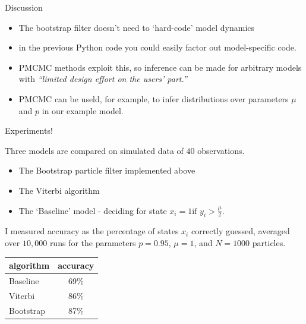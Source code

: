 \documentclass[pdf]
{beamer}
\begin{document}
\begin{frame}{Discussion}
	\begin{itemize}
		\item The bootstrap filter doesn't need to `hard-code' model dynamics
		\item in the previous Python code you could easily factor out model-specific code.
		\item PMCMC methods exploit this, so inference can be made for arbitrary models with
			  \textit{``limited design effort on the users' part.''}
		\item PMCMC can be useld, for example, to infer distributions over parameters $\mu$ and $p$ in our
			  example model.
	\end{itemize}
\end{frame}



\begin{frame}{Experiments!}

Three models are compared on simulated data of $40$ observations.

\begin{itemize}
	\item The Bootstrap particle filter implemented above
	\item The Viterbi algorithm
	\item The `Baseline' model - deciding for state $x_i = 1 \text{if } y_i > \frac{\mu}{2}$.
\end{itemize}

I measured accuracy as the percentage of states $x_i$ correctly guessed, averaged over $10,000$ runs for the parameters $ p = 0.95 $, $\mu = 1$, and $N = 1000$ particles.

\vspace{5mm}

\begin{table}
	\centering
	\begin{tabular}{ l | c }
	  algorithm & accuracy \\
	  \hline
	  Baseline 	& 69\% \\
	  Viterbi 	& 86\% \\
	  Bootstrap & 87\% \\
	\end{tabular}
\end{table}

\end{frame}
\end{document}
